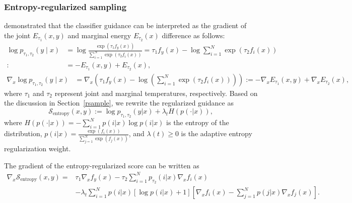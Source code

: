 \documentclass{article}
\newcommand{\todoa}[2][]{\todo[size=tiny,color=blue!20!white,#1]{GA: #2}\xspace}
\begin{document}
\subsubsection{Entropy-regularized sampling}
\cite{ma2023elucidating} demonstrated that the classifier guidance can be interpreted as the gradient of the joint $E_{\tau_1}(x, y)$ and marginal energy $E_{\tau_2}(x)$ difference as follows:
\begin{equation}
    \begin{aligned}
    \log p_{\tau_1, \tau_2}(y \mid x)&=  \log \frac{\exp \left(\tau_1 f_y(x)\right)}{\sum_{i=1}^N \exp \left(\tau_2 f_i(x)\right)}=\tau_1 f_y(x)-\log \sum_{i=1}^N \exp \left(\tau_2 f_i(x)\right)\\
    :&=-E_{\tau_1}(x, y)+E_{\tau_2}(x),
        \end{aligned}
\end{equation}
{\fontsize{8.5}{10}\selectfont
\begin{equation}\label{energy-eq1}
    \begin{aligned}
    \nabla_x \log p_{\tau_1, \tau_2}(y \mid x)&=\nabla_x\left(\tau_1 f_y(x)-\log \left(\sum_{i=1}^N \exp \left(\tau_2 f_i(x)\right)\right)\right):=-\nabla_x E_{\tau_1}(x, y)+\nabla_x E_{\tau_2}(x), 
            \end{aligned}
\end{equation}
}
where $\tau_1$ and $\tau_2$ represent joint and marginal temperatures, respectively. Based on the discussion in Section~\ref{rsample}, we rewrite the regularized guidance as
\begin{equation}
    \mathcal{S}_{\text{entropy}}(x, y) := \log p_{\tau_1,\tau_2}(y|x) + \lambda_t H(p(\cdot|x)),
\end{equation}
where $H(p(\cdot|x)) = -\sum_{i=1}^N p(i|x) \log p(i|x)$ is the entropy of the distribution, $p(i|x) = \frac{\exp( f_i(x))}{\sum_{j=1}^N \exp( f_j(x))}$, and $\lambda (t)\geq 0$ is the adaptive entropy regularization weight. 
\begin{proposition}
\label{pr1}
The gradient of the entropy-regularized score can be written as
{\fontsize{8.5}{10}\selectfont
\begin{align}
\nabla_x \mathcal{S}_{\text{entropy}}(x, y) = &\tau_1 \nabla_x f_y(x) - \tau_2 \sum_{i=1}^N p_{\tau_2}(i|x) \nabla_x f_i(x)\\
&- \lambda_t \sum_{i=1}^N p(i|x)[\log p(i|x) + 1] \left[\nabla_x f_i(x) - \sum_{j=1}^N p(j|x) \nabla_x f_j(x)\right].
\end{align}
}


\end{proposition}
\end{document}
